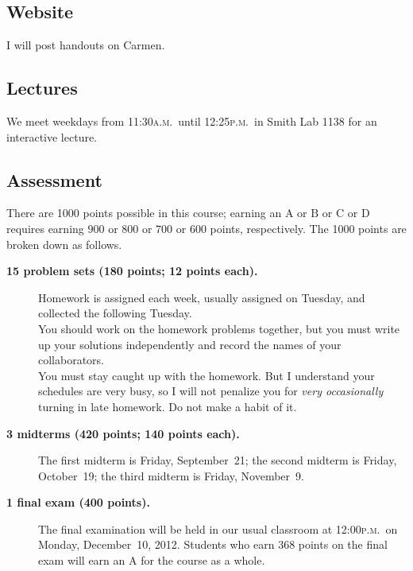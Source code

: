 \documentclass[12pt]{handout}
\newcommand{\peem}{\textsc{p.m.}}
\newcommand{\ayem}{\textsc{a.m.}}
\begin{document}
\subsection*{Website}

I will post handouts on Carmen.

\subsection*{Lectures}

We meet weekdays from 11:30\ayem\ until 12:25\peem\ in Smith Lab 1138 for an interactive lecture.

\subsection*{Assessment}


There are 1000 points possible in this course; earning an $\mathrm{A}$ or $\mathrm{B}$ or $\mathrm{C}$ or $\mathrm{D}$ requires earning $900$ or $800$ or $700$ or $600$ points, respectively.  The 1000 points are broken down as follows.

\begin{description}
\item[\textsf{\textbf{15 problem sets (180 points; 12 points each).}}]
  Homework is assigned each week, usually assigned on Tuesday, and
  collected the following Tuesday.\vspace{1ex}\\
  You should work on the homework problems together, but you must
  write up your solutions independently and record the names of your collaborators. \vspace{1ex}\\
  You must stay caught up with the homework. But I understand your
  schedules are very busy, so I will not penalize you for
  \textit{very occasionally} turning in late homework.  Do not make a habit
  of it.

\item[\textsf{\textbf{3 midterms (420 points; 140 points each).}}]
The first midterm is Friday, September~21; the second midterm is Friday, October~19; the third midterm is Friday, November~9.

\item[\textsf{\textbf{1 final exam (400 points).}}]  The final examination will be held in our usual classroom at 12:00\peem\ on Monday, December~10, 2012.  Students who earn 368 points on the final exam will earn an $\mathrm{A}$ for the course as a whole.

\end{description}
\end{document}
